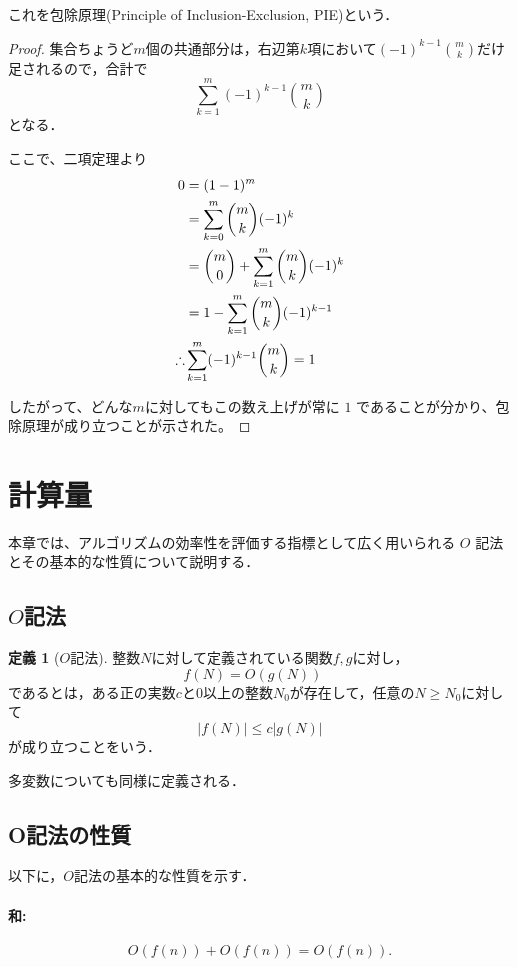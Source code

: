 \documentclass{jsreport}
\theoremstyle{plain} %
\theoremstyle{definition}
\newtheorem{definition}{定義}
\begin{document}
これを包除原理(Principle of Inclusion-Exclusion, PIE)という．

\begin{proof}
集合ちょうど$m$個の共通部分は，右辺第$k$項において$(-1)^{k-1}\binom{m}{k}$だけ足されるので，合計で
\[
\sum_{k=1}^m (-1)^{k-1} \binom{m}{k}
\]
となる．

ここで、二項定理より
\begin{align}
    0 &= (1 - 1)^m  \notag \\
    &= \sum_{k=0}^m \binom{m}{k} (-1)^k  \notag \\
    &= \binom{m}{0} + \sum_{k=1}^m \binom{m}{k} (-1)^k  \notag \\
    &= 1 - \sum_{k=1}^m \binom{m}{k} (-1)^{k-1} \notag \\
    \therefore &\sum_{k=1}^m (-1)^{k-1} \binom{m}{k} = 1\notag
\end{align}

したがって、どんな$m$に対してもこの数え上げが常に $1$ であることが分かり、包除原理が成り立つことが示された。
\end{proof}

\section{計算量}

本章では、アルゴリズムの効率性を評価する指標として広く用いられる $O$ 記法とその基本的な性質について説明する．

\subsection{$O$記法}

\begin{definition}[$O$記法]
    整数$N$に対して定義されている関数$f, g$に対し，
    \[
    f(N) = O(g(N)) \quad
    \]
    であるとは，ある正の実数$c$と0以上の整数$N_0$が存在して，任意の$N \geq N_0$に対して
    \[
    |f(N)| \leq c|g(N)|
    \]
    が成り立つことをいう．
\end{definition}
多変数についても同様に定義される．

\subsection{O記法の性質}

以下に，$O$記法の基本的な性質を示す．

\paragraph{和:}
\[
O(f(n)) + O(f(n)) = O(f(n)).
\]
\end{document}
